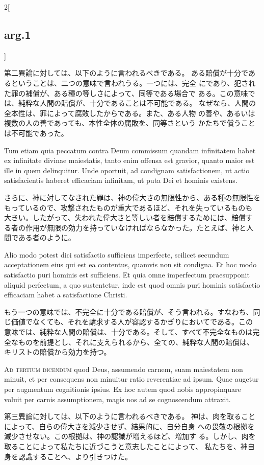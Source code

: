 \documentclass[paper=a4paper,fontsize=10pt,jafontsize=9pt,titlepage]{jlreq}
\begin{document}
\begin{paracol}{2}[\subsection{arg.1}]
\switchcolumn

第二異論に対しては、以下のように言われるべきである。
ある賠償が十分であるということは、二つの意味で言われうる。一つには、完全
 にであり、犯された罪の補償が、ある種の等しさによって、同等である場合で
 ある。この意味では、純粋な人間の賠償が、十分であることは不可能である。
 なぜなら、人間の全本性は、罪によって腐敗したからである。また、ある人物
 の善や、あるいは複数の人の善であっても、本性全体の腐敗を、同等さという
 かたちで償うことは不可能であった。

\switchcolumn*

Tum etiam quia peccatum contra Deum commissum quandam
 infinitatem habet ex infinitate divinae maiestatis, tanto enim offensa
 est gravior, quanto maior est ille in quem delinquitur. Unde oportuit,
 ad condignam satisfactionem, ut actio satisfacientis haberet efficaciam
 infinitam, ut puta Dei et hominis existens.

\switchcolumn

さらに、神に対してなされた罪は、神の偉大さの無限性から、ある種の無限性を
 もっているので、攻撃されたものが重大であるほど、それを失っているものも
 大きい。したがって、失われた偉大さと等しい者を賠償するためには、賠償す
 る者の作用が無限の効力を持っていなければならなかった。たとえば、神と人
 間である者のように。

\switchcolumn*

Alio modo potest dici
 satisfactio sufficiens imperfecte, scilicet secundum acceptationem eius
 qui est ea contentus, quamvis non sit condigna. Et hoc modo satisfactio
 puri hominis est sufficiens. Et quia omne imperfectum praesupponit
 aliquid perfectum, a quo sustentetur, inde est quod omnis puri hominis
 satisfactio efficaciam habet a satisfactione Christi.

\switchcolumn

もう一つの意味では、不完全に十分である賠償が、そう言われる。すなわち、同
 じ価値でなくても、それを請求する人が容認するかぎりにおいてである。この
 意味では、純粋な人間の賠償は、十分である。そして、すべて不完全なものは完
 全なものを前提とし、それに支えられるから、全ての、純粋な人間の賠償は、
 キリストの賠償から効力を持つ。

\switchcolumn*[\subsection{ad.3}]

{\scshape Ad tertium dicendum} quod Deus, assumendo carnem, suam
 maiestatem non minuit, et per consequens non minuitur ratio reverentiae
 ad ipsum. Quae augetur per augmentum cognitionis ipsius. Ex hoc autem
 quod nobis appropinquare voluit per carnis assumptionem, magis nos ad
 se cognoscendum attraxit.

\switchcolumn

第三異論に対しては、以下のように言われるべきである。
神は、肉を取ることによって、自らの偉大さを減少させず、結果的に、自分自身
 への畏敬の根拠を減少させない。この根拠は、神の認識が増えるほど、増加す
 る。しかし、肉を取ることによって私たちに近づこうと意志したことによって、
 私たちを、神自身を認識することへ、より引きつけた。

\end{paracol}
\end{document}
